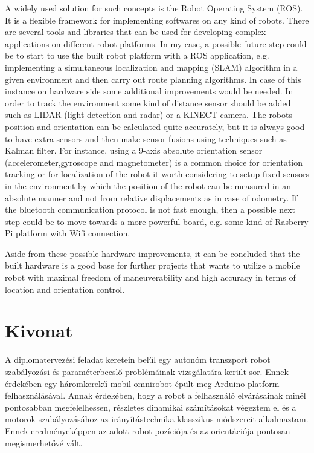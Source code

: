 \documentclass[12pt,english,twoside]{article}
\begin{document}
A widely used solution for such concepts is the Robot Operating System (ROS). It is a flexible framework for implementing softwares on any kind of robots. There are several tools and libraries that can be used for developing complex applications on different robot platforms. In my case, a possible future step could be to start to use the built robot platform with a ROS application, e.g. implementing a simultaneous localization and mapping (SLAM) algorithm in a given environment and then carry out route planning algorithms. In case of this instance on hardware side some additional improvements would be needed. In order to track the environment some kind of distance sensor should be added such as LIDAR (light detection and radar) or a KINECT camera. The robots position and orientation can be calculated quite accurately, but it is always good to have extra sensors and then make sensor fusions using techniques such as Kalman filter. For instance, using a 9-axis absolute orientation sensor (accelerometer,gyroscope and magnetometer) is a common choice for orientation tracking or for localization of the robot it worth considering to setup fixed sensors in the environment by which the position of the robot can be measured in an absolute manner and not from relative displacements as in case of odometry. If the bluetooth communication protocol is not fast enough, then a possible next step could be to move towards a more powerful board, e.g. some kind of Rasberry Pi platform with Wifi connection. 

Aside from these possible hardware improvements, it can be concluded that the built hardware is a good base for further projects that wants to utilize a mobile robot with maximal freedom of maneuverability and high accuracy in terms of location and orientation control.

\newpage
\section*{Kivonat}
A diplomatervezési feladat keretein belül egy autonóm transzport robot szabályozási és paraméterbecslő problémáinak vizsgálatára került sor. Ennek érdekében egy háromkerekű mobil omnirobot épült meg Arduino platform felhasználásával. Annak érdekében, hogy a robot a felhasználó elvárásainak minél pontosabban megfelelhessen, részletes dinamikai számításokat végeztem el és a motorok szabályozásához az irányítástechnika klasszikus módszereit alkalmaztam. Ennek eredményeképpen az adott robot pozíciója és az orientációja pontosan megismerhetővé vált.
\end{document}
